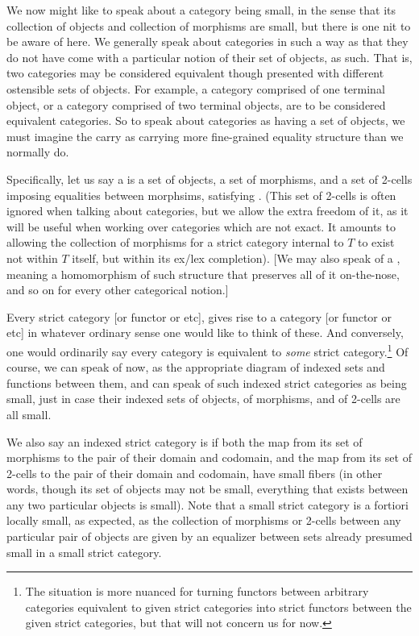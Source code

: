 We now might like to speak about a category being small, in the sense that its collection of objects and collection of morphisms are small, but there is one nit to be aware of here. We generally speak about categories in such a way as that they do not have come with a particular notion of their set of objects, as such. That is, two categories may be considered equivalent though presented with different ostensible sets of objects. For example, a category comprised of one terminal object, or a category comprised of two terminal objects, are to be considered equivalent categories. So to speak about categories as having a set of objects, we must imagine the carry as carrying more fine-grained equality structure than we normally do.

Specifically, let us say a  is a set of objects, a set of morphisms, and a set of 2-cells imposing equalities between morphsims, satisfying \TODO. (This set of 2-cells is often ignored when talking about categories, but we allow the extra freedom of it, as it will be useful when working over categories which are not exact. It amounts to allowing the collection of morphisms for a strict category internal to $T$ to exist not within $T$ itself, but within its ex/lex completion). [We may also speak of a , meaning a homomorphism of such structure that preserves all of it on-the-nose, and so on for every other categorical notion.]

Every strict category [or functor or etc], gives rise to a category [or functor or etc] in whatever ordinary sense one would like to think of these. And conversely, one would ordinarily say every category is equivalent to \emph{some} strict category.\footnote{The situation is more nuanced for turning functors between arbitrary categories equivalent to given strict categories into strict functors between the given strict categories, but that will not concern us for now.} Of course, we can speak of  now, as the appropriate diagram of indexed sets and functions between them, and can speak of such indexed strict categories as being small, just in case their indexed sets of objects, of morphisms, and of 2-cells are all small.

We also say an indexed strict category is  if both the map from its set of morphisms to the pair of their domain and codomain, and the map from its set of 2-cells to the pair of their domain and codomain, have small fibers (in other words, though its set of objects may not be small, everything that exists between any two particular objects is small). Note that a small strict category is a fortiori locally small, as expected, as the collection of morphisms or 2-cells between any particular pair of objects are given by an equalizer between sets already presumed small in a small strict category.

